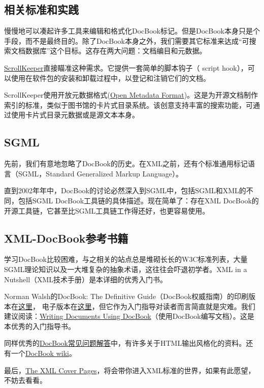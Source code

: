\documentclass[12pt,oneside]{book}
\begin{document}
\begin{common-format}
\subsection{相关标准和实践}
慢慢地可以凑起许多工具来编辑和格式化DocBook标记。但是DocBook本身只是个手段，而不是最终目的。除了DocBook本身之外，我们需要其它标准来达成“可搜索文档数据库”这个目标。这存在两大问题：文档编目和元数据。

\href{http://scrollkeeper.sourceforge.net/}{ScrollKeeper}直接瞄准这种需求。它提供一套简单的脚本钩子（ script hook），可以使用在软件包的安装和卸载过程中，以登记和注销它们的文档。

ScrollKeeper使用开放元数据格式(\href{http://www.ibiblio.org/osrt/omf/}{Open Metadata Format})。这是为开源文档制作索引的标准，类似于图书馆的卡片式目录系统。该创意支持丰富的搜索功能，可通过使用卡片式目录元数据或是源文本本身。

\subsection{SGML}
先前，我们有意地忽略了DocBook的历史。在XML之前，还有个标准通用标记语言（SGML，Standard Generalized Markup Language）。

直到2002年年中，DocBook的讨论必然深入到SGML中，包括SGML和XML的不同，包括SGML DocBook工具链的具体描述。现在简单了：存在XML DocBook的开源工具链，它甚至比SGML工具链工作得还好，也更容易使用。

\subsection{XML-DocBook参考书籍}
学习DocBook比较困难，与之相关的站点总是堆砌长长的W3C标准列表，大量SGML理论知识以及一大堆复杂的抽象术语，这往往会吓退初学者。XML in a Nutshell（XML技术手册）\cite{Harold-Means}是本详细的优秀入门书。

Norman Walsh的DocBook: The Definitive Guide（DocBook权威指南）的印刷版本在\href{http://www.oreilly.com/catalog/docbook/}{这里}，  电子版本在\href{http://www.docbook.org/tdg/en/html/docbook.html}{这里}，但它作为入门指导对读者而言简直就是灾难。我们建议阅读：\href{http://xml.web.cern.ch/XML/goossens/dbatcern/}{Writing Documents Using DocBook}（使用DocBook编写文档）。这是本优秀的入门指导书。

同样优秀的\href{http://www.dpawson.co.uk/docbook/}{DocBook常见问题解答}中，有许多关于HTML输出风格化的资料。还有一个\href{http://docbook.org/wiki/moin.cgi}{DocBook wiki}。

最后，\href{http://xml.coverpages.org/}{The XML Cover Pages}，将会带你进入XML标准的世界，如果有此愿望，不妨去看看。


\end{common-format}
\end{document}
